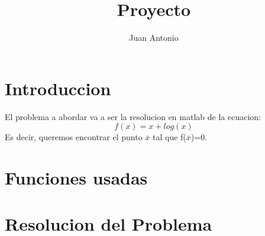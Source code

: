 \documentclass[a4paper]{article}
\title{Proyecto}
\author{Juan Antonio}
\date{}
\begin{document}
\maketitle


\section{Introduccion}
El problema a abordar va a ser la resolucion en matlab de la ecuacion:
\begin{equation}
f(x)=x+log(x)
\end{equation}
Es decir, queremos encontrar el punto $\overline{x}$ tal que f($\overline{x}$)=0.

\section{Funciones usadas}

\section{Resolucion del Problema}
\end{document}
